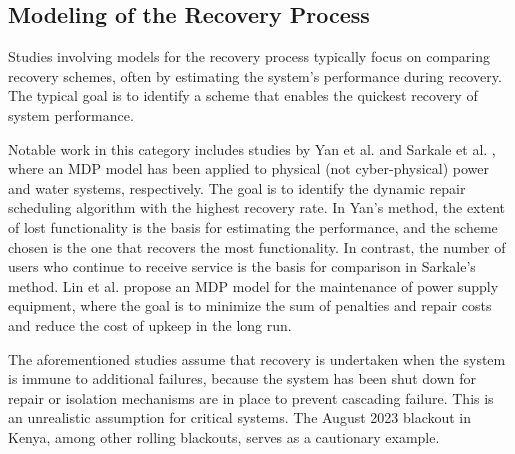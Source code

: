 \documentclass[runningheads]{llncs}
\begin{document}

\subsection{Modeling of the Recovery Process }
Studies involving models for the recovery process typically focus on comparing recovery schemes, often by estimating the system's performance during recovery. The typical goal is to identify a scheme that enables the quickest recovery of system performance. 

Notable work in this category includes studies by Yan et al. \cite{yan_dynamic_2021} and Sarkale et al. \cite{sarkale_solving_2018}, where an MDP model has been applied to physical (not cyber-physical) power and water systems, respectively. The goal is to identify the dynamic repair scheduling algorithm with the highest recovery rate.   %
In Yan's method, the extent of lost functionality is the basis for estimating the performance, and the scheme chosen is the one that recovers the most functionality. In contrast, the number of users who continue to receive service is the basis for comparison in Sarkale's method. 
Lin et al. \cite{lin_condition-based_2022} propose an  MDP model for the maintenance of power supply equipment, where the goal is to minimize the sum of penalties and repair costs and reduce the cost of upkeep in the long run.

The aforementioned studies assume that recovery is undertaken when the system is immune to additional failures, because the system has been shut down for repair or isolation mechanisms are in place to prevent cascading failure. This is an unrealistic assumption for critical systems. The August 2023 blackout in Kenya, among other rolling blackouts, serves as a cautionary example. 

\end{document}
